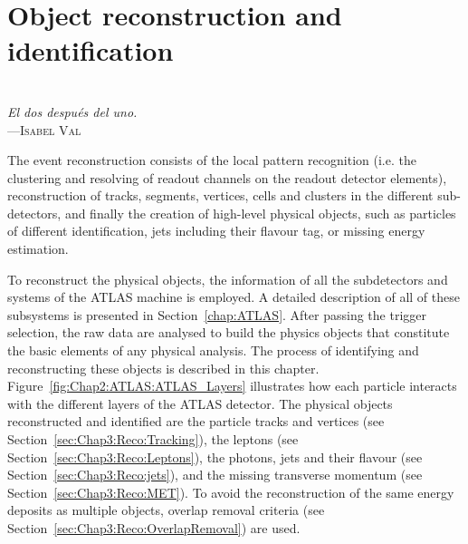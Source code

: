 \begin{comment}
%
%
asdf
\end{comment}




\chapter{Object reconstruction and identification}

\label{chap:ObjectReconstruction}

\vspace*{0.1 cm} 
\hspace*{200pt} \\
\hspace*{200pt} \textit{El dos después del uno.} \\
\hspace*{225pt} ---\textsc{Isabel Val}\\%
\vspace*{2cm} 


The event reconstruction consists of the local pattern recognition (i.e. the
clustering and resolving of readout channels on the readout detector
elements), reconstruction of tracks, segments, vertices, cells and clusters in the
different sub-detectors, and finally the creation of high-level physical objects, such as
particles of different identification, jets including their flavour tag, or missing
energy estimation.

To reconstruct the physical objects, the information of all the subdetectors and systems of the ATLAS machine is employed.
A detailed description of all of these subsystems is presented in Section~\ref{chap:ATLAS}. 
After passing the trigger selection, the raw data are analysed to build the physics objects that constitute the
basic elements of any physical analysis. The process of  identifying and reconstructing these objects is described in this chapter.
Figure~\ref{fig:Chap2:ATLAS:ATLAS_Layers} illustrates how each particle interacts with the different layers of 
the ATLAS detector. 
The physical objects reconstructed and identified are the particle tracks and vertices (see Section~\ref{sec:Chap3:Reco:Tracking}), 
the leptons (see Section~\ref{sec:Chap3:Reco:Leptons}), the photons, jets and their flavour 
(see Section~\ref{sec:Chap3:Reco:jets}),
and the missing transverse momentum (see Section~\ref{sec:Chap3:Reco:MET}).
To avoid the reconstruction of the same energy deposits as multiple objects, overlap
removal criteria (see Section~\ref{sec:Chap3:Reco:OverlapRemoval}) are used.

